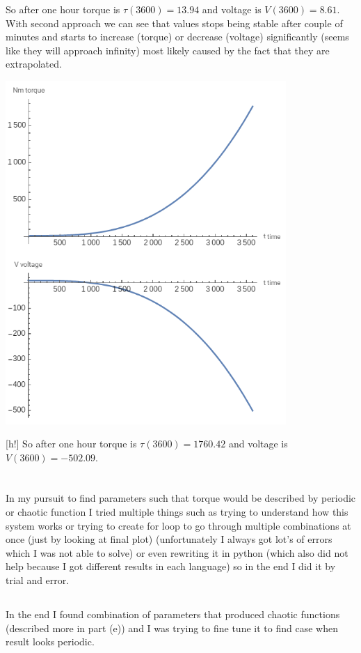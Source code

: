 \documentclass[a4paper]{article}
\begin{document}
	So after one hour torque is $\tau(3600)=13.94$ and voltage is $V(3600)=8.61$.
	\\
	With second approach we can see that values stops being stable after couple of minutes and starts to increase (torque) or decrease (voltage) significantly (seems like they will approach infinity) most likely caused by the fact that they are extrapolated.
	\\
	\centerline{\includegraphics[width=0.8\textwidth]{2_d_vt_2}}[h!]
	So after one hour torque is $\tau(3600)=1760.42$ and voltage is $V(3600)=-502.09$.
	
	\section{}
	In my pursuit to find parameters such that torque would be described by periodic or chaotic function I tried multiple things such as trying to understand how this system works or trying to create for loop to go through multiple combinations at once (just by looking at final plot) (unfortunately I always got lot's of errors which I was not able to solve) or even rewriting it in python (which also did not help because I got different results in each language) so in the end I did it by trial and error.
	\subsection{}
	In the end I found combination of parameters that produced chaotic functions (described more in part (e)) and I was trying to fine tune it to find case when result looks periodic.
	
\end{document}

